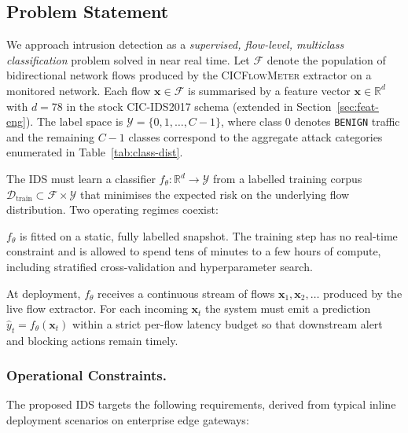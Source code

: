 \subsection{Problem Statement}
\label{sec:problem-statement}

We approach intrusion detection as a \emph{supervised, flow-level, multiclass classification} problem solved in near real time. Let $\mathcal{F}$ denote the population of bidirectional network flows produced by the \textsc{CICFlowMeter} extractor on a monitored network. Each flow $\mathbf{x} \in \mathcal{F}$ is summarised by a feature vector $\mathbf{x} \in \mathbb{R}^{d}$ with $d = 78$ in the stock CIC-IDS2017 schema (extended in Section~\ref{sec:feat-eng}). The label space is $\mathcal{Y} = \{0, 1, \ldots, C{-}1\}$, where class $0$ denotes \texttt{BENIGN} traffic and the remaining $C{-}1$ classes correspond to the aggregate attack categories enumerated in Table~\ref{tab:class-dist}.

The IDS must learn a classifier $f_\theta : \mathbb{R}^{d} \to \mathcal{Y}$ from a labelled training corpus $\mathcal{D}_{\text{train}} \subset \mathcal{F} \times \mathcal{Y}$ that minimises the expected risk on the underlying flow distribution. Two operating regimes coexist:

\begin{description}[leftmargin=1.2em,itemsep=2pt,topsep=2pt]
    \item[Offline training.] $f_\theta$ is fitted on a static, fully labelled snapshot. The training step has no real-time constraint and is allowed to spend tens of minutes to a few hours of compute, including stratified cross-validation and hyperparameter search.
    \item[Online inference.] At deployment, $f_\theta$ receives a continuous stream of flows $\mathbf{x}_1, \mathbf{x}_2, \ldots$ produced by the live flow extractor. For each incoming $\mathbf{x}_t$ the system must emit a prediction $\hat{y}_t = f_\theta(\mathbf{x}_t)$ within a strict per-flow latency budget so that downstream alert and blocking actions remain timely.
\end{description}

\subsubsection*{Operational Constraints.}
The proposed IDS targets the following requirements, derived from typical inline deployment scenarios on enterprise edge gateways:

